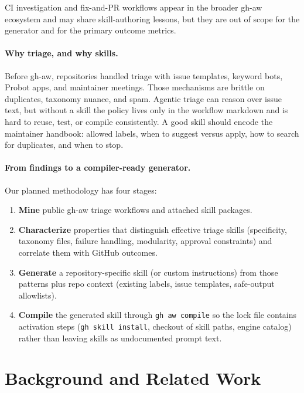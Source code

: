 \documentclass[sigconf,review,anonymous]{acmart}
\begin{document}
CI investigation and fix-and-PR workflows appear in the broader gh-aw ecosystem
and may share skill-authoring lessons, but they are out of scope for the generator
and for the primary outcome metrics.

\paragraph{Why triage, and why skills.}
Before gh-aw, repositories handled triage with issue templates, keyword bots,
Probot apps, and maintainer meetings.
Those mechanisms are brittle on duplicates, taxonomy nuance, and spam.
Agentic triage can reason over issue text, but without a skill the policy lives
only in the workflow markdown and is hard to reuse, test, or compile consistently.
A good skill should encode the maintainer handbook: allowed labels, when to
suggest versus apply, how to search for duplicates, and when to stop.

\paragraph{From findings to a compiler-ready generator.}
Our planned methodology has four stages:
\begin{enumerate}
  \item \textbf{Mine} public gh-aw triage workflows and attached skill packages.
  \item \textbf{Characterize} properties that distinguish effective triage skills
        (specificity, taxonomy files, failure handling, modularity, approval
        constraints) and correlate them with GitHub outcomes.
  \item \textbf{Generate} a repository-specific skill (or custom instructions)
        from those patterns plus repo context (existing labels, issue templates,
        safe-output allowlists).
  \item \textbf{Compile} the generated skill through \texttt{gh aw compile} so
        the lock file contains activation steps (\texttt{gh skill install},
        checkout of skill paths, engine catalog) rather than leaving skills as
        undocumented prompt text.
\end{enumerate}

\section{Background and Related Work}
\label{sec:related}
\end{document}
